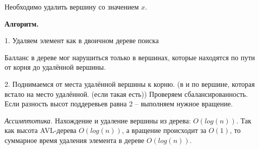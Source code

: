 Необходимо удалить вершину со значением $x$. 

\textbf{Алгоритм.} 

1. Удаляем элемент как в двоичном дереве поиска

Балланс в дереве мог нарушиться только в вершинах, которые находятся по пути от корня до удалённой вершины.

2. Поднимаемся от места удалённой вершины к корню. (в и по вершине, которая встало на место удалённой. (если такая есть)) Проверяем сбалансированность. Если разность высот поддеревьев равна 2 – выполняем нужное вращение.

\textit{Ассимптотика.} Нахождение и удаление вершины из дерева: $O(log(n))$. Так как высота AVL-дерева $O(log(n))$, а вращение происходит за $O(1)$, то суммарное время удаления элемента в дереве $O(log(n))$. 